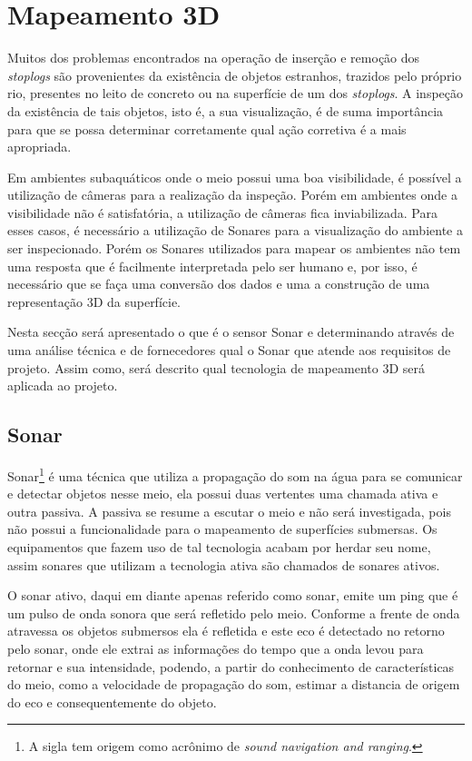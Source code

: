 \section{Mapeamento 3D}

Muitos dos problemas encontrados na operação de inserção e remoção dos
\textit{stoplogs} são provenientes da existência de objetos estranhos, trazidos
pelo próprio rio, presentes no leito de concreto ou na superfície de um dos
\textit{stoplogs}. A inspeção da existência de tais objetos, isto é, a sua
visualização, é de suma importância para que se possa determinar corretamente
qual ação corretiva é a mais apropriada.

Em ambientes subaquáticos onde o meio possui uma boa visibilidade, é possível a
utilização de câmeras para a realização da inspeção. Porém em ambientes onde a
visibilidade não é satisfatória, a utilização de câmeras fica inviabilizada.
Para esses casos, é necessário a utilização de Sonares para a
visualização do ambiente a ser inspecionado. Porém os Sonares utilizados para
mapear os ambientes não tem uma resposta que é facilmente interpretada pelo ser
humano e, por isso, é necessário que se faça uma conversão dos dados e uma a
construção de uma representação 3D da superfície.

Nesta secção será apresentado o que é o sensor Sonar e determinando através de uma análise técnica e de fornecedores qual o Sonar que atende aos requisitos de projeto. Assim como, será descrito qual tecnologia de mapeamento 3D será aplicada ao projeto. 



\subsection{Sonar}
Sonar\footnote{A sigla tem origem como acrônimo de \textit{sound navigation and ranging}.} é uma técnica que utiliza a propagação do som na água para se comunicar e detectar objetos nesse meio, ela possui duas vertentes uma chamada ativa e outra passiva. A passiva se resume a escutar o meio e não será investigada, pois não possui a funcionalidade para o mapeamento de superfícies submersas. Os equipamentos que fazem uso de tal tecnologia acabam por herdar seu nome, assim sonares que utilizam a tecnologia ativa são chamados de sonares ativos.

O sonar ativo, daqui em diante apenas referido como sonar, emite um ping que é um pulso de onda sonora que será refletido pelo meio. Conforme a frente de onda atravessa os objetos submersos ela é refletida e este eco é detectado no retorno pelo sonar, onde ele extrai as informações do tempo que a onda levou para retornar e sua intensidade, podendo, a partir do conhecimento de características do meio, como a velocidade de propagação do som, estimar a distancia de origem do eco e consequentemente do objeto.

